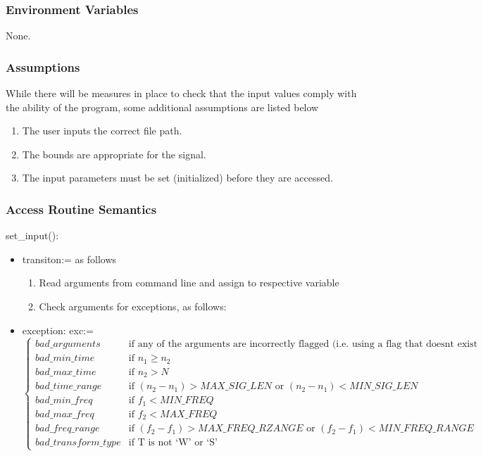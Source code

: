 \documentclass[12pt, titlepage]{article}
\begin{document}
\subsubsection{Environment Variables}
None.

\subsubsection{Assumptions}
While there will be measures in place to check that the input values comply with the ability of the program, some additional assumptions are listed below
\begin{enumerate}
\item The user inputs the correct file path.
\item The bounds are appropriate for the signal.
\item The input parameters must be set (initialized) before they are accessed. 
\end{enumerate}

\subsubsection{Access Routine Semantics}

set\_input():
\begin{itemize}
\item transiton:= as follows
\begin{enumerate}
\item Read arguments from command line and assign to respective variable
\item Check arguments for exceptions, as follows:
\end{enumerate}
\item exception: exc:=
\[ \begin{cases} 
 bad\_arguments & \text{if any of the arguments are incorrectly flagged (i.e. using a flag that doesnt exist}\\ 
 bad\_min\_time & \text{if } n_1 \geq n_2 \\
 bad\_max\_time & \text{if } n_2>N \\ 
 bad\_time\_range & \text{if } (n_2 - n_1)> MAX\_SIG\_LEN \text{ or } (n_2 - n_1)<MIN\_SIG\_LEN \\
 bad\_min\_freq  & \text{if } f_1 < MIN\_FREQ \\
 bad\_max\_freq  & \text{if } f_2 < MAX\_FREQ \\
 bad\_freq\_range &  \text{if } (f_2 - f_1)> MAX\_FREQ\_RZANGE \text{ or } (f_2 - f_1)<MIN\_FREQ\_RANGE\\
  bad\_transform\_type &  \text{if T is not `W' or `S'}
   \end{cases}
\]
\end{itemize}
\end{document}
